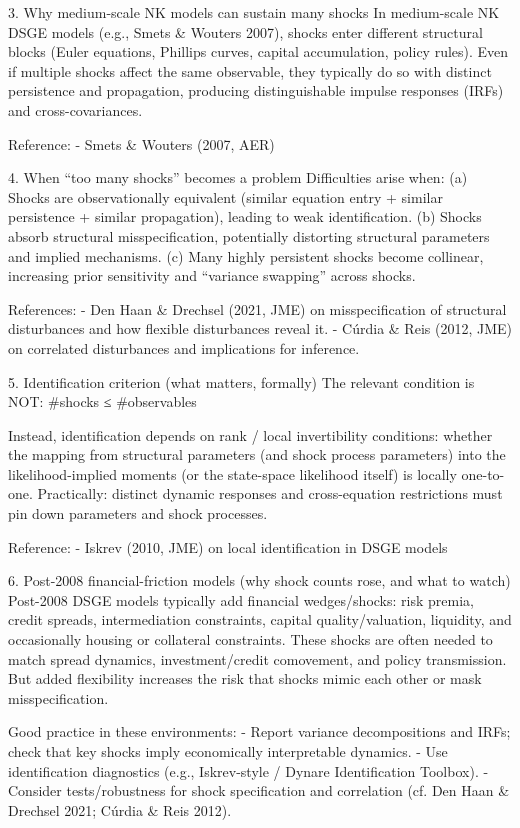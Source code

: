 3. Why medium-scale NK models can sustain many shocks
In medium-scale NK DSGE models (e.g., Smets & Wouters 2007), shocks enter different structural blocks (Euler equations,
Phillips curves, capital accumulation, policy rules). Even if multiple shocks affect the same observable, they typically do so
with distinct persistence and propagation, producing distinguishable impulse responses (IRFs) and cross-covariances.

Reference:
- Smets & Wouters (2007, AER)

4. When “too many shocks” becomes a problem
Difficulties arise when:
(a) Shocks are observationally equivalent (similar equation entry + similar persistence + similar propagation), leading to weak identification.
(b) Shocks absorb structural misspecification, potentially distorting structural parameters and implied mechanisms.
(c) Many highly persistent shocks become collinear, increasing prior sensitivity and “variance swapping” across shocks.

References:
- Den Haan & Drechsel (2021, JME) on misspecification of structural disturbances and how flexible disturbances reveal it.
- Cúrdia & Reis (2012, JME) on correlated disturbances and implications for inference.

5. Identification criterion (what matters, formally)
The relevant condition is NOT:
  #shocks ≤ #observables

Instead, identification depends on rank / local invertibility conditions: whether the mapping from structural parameters
(and shock process parameters) into the likelihood-implied moments (or the state-space likelihood itself) is locally one-to-one.
Practically: distinct dynamic responses and cross-equation restrictions must pin down parameters and shock processes.

Reference:
- Iskrev (2010, JME) on local identification in DSGE models

6. Post-2008 financial-friction models (why shock counts rose, and what to watch)
Post-2008 DSGE models typically add financial wedges/shocks: risk premia, credit spreads, intermediation constraints,
capital quality/valuation, liquidity, and occasionally housing or collateral constraints. These shocks are often needed to match
spread dynamics, investment/credit comovement, and policy transmission. But added flexibility increases the risk that shocks
mimic each other or mask misspecification.

Good practice in these environments:
- Report variance decompositions and IRFs; check that key shocks imply economically interpretable dynamics.
- Use identification diagnostics (e.g., Iskrev-style / Dynare Identification Toolbox).
- Consider tests/robustness for shock specification and correlation (cf. Den Haan & Drechsel 2021; Cúrdia & Reis 2012).

